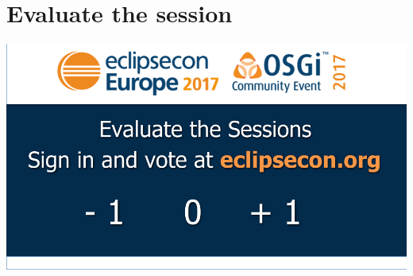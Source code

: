 \documentclass{beamer}
\begin{document}
\section{Evaluate the session}
\begin{frame}[fragile]
\begin{center}
\includegraphics[width=\textwidth,height=0.8\textheight,keepaspectratio]{SpeakerEvalSlide-16-9-2017.png}
\end{center}
\end{frame}
\end{document}
